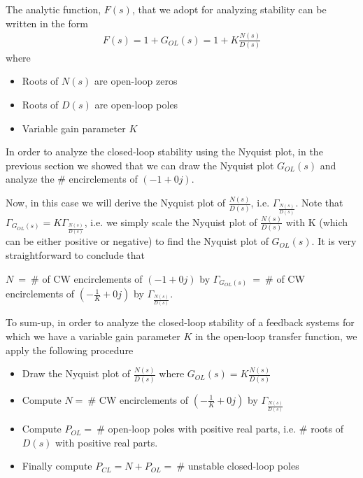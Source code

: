 \documentclass[twoside]{article}
\begin{document}
The analytic function, $F(s)$, that we adopt for analyzing stability 
can be written in the form  
%
\begin{align*}
  F(s) = 1 + G_{OL}(s) = 1 + K \frac{ N(s) }{ D(s) } 
\end{align*}
%
where 
\begin{itemize}
  \item Roots of $N(s)$ are open-loop zeros
  \item Roots of $D(s)$ are open-loop poles
  \item Variable gain parameter $K$
\end{itemize}
%
In order to analyze the closed-loop stability using the Nyquist plot,
in the previous section we showed that 
we can draw the Nyquist plot $G_{OL}(s)$
and analyze the $\#$ encirclements of $(-1 + 0 j)$.

Now, in this case we will derive the Nyquist plot of 
$\frac{N(s)}{D(s)}$, i.e. $\Gamma_{\frac{N(s)}{D(s)}}$. 
Note that $\Gamma_{G_{OL}(s)} = K \Gamma_{\frac{N(s)}{D(s)}}$,
i.e. we simply scale the Nyquist plot of $\frac{N(s)}{D(s)}$
with K (which can be either positive or negative) to find the
Nyquist plot of $G_{OL}(s)$. It is very straightforward to
conclude that 

\vspace{6 pt}

$N \ = \ \#$ of CW encirclements of $(-1 + 0 j)$ by  $\Gamma_{G_{OL}(s)} \
= \ \#$ of CW encirclements of $\left( -\frac{1}{K} + 0 j \right)$ by  $\Gamma_{\frac{N(s)}{D(s)}}$.

\vspace{6 pt}

To sum-up, in order to analyze the closed-loop stability of a 
feedback systems for which we have a variable gain parameter $K$ in
the open-loop transfer function, we apply the following 
procedure 

\begin{itemize}
 \item Draw the Nyquist plot of $\frac{N(s)}{D(s)}$ where $G_{OL}(s) =
   K \frac{N(s)}{D(s)}$
 \item Compute $N = \ \#$ CW encirclements of $\left( -\frac{1}{K}  + 0 j \right)$ by
   $\Gamma_{ \frac{N(s)}{D(s)} }$ 
 \item Compute $P_{OL} = \ \#$ open-loop poles with
   positive real parts, i.e. $\#$ roots of $D(s)$ with positive real parts.
 \item Finally compute $P_{CL} = N +  P_{OL} = \ \#$
   unstable closed-loop poles  
\end{itemize}
\end{document}
